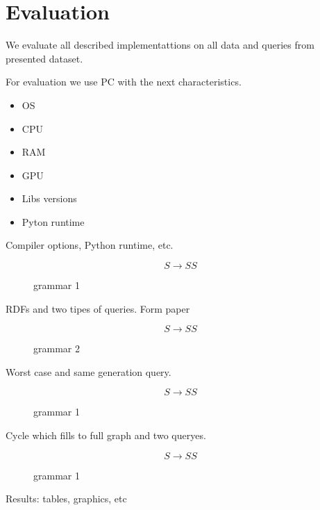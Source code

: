 \section{Evaluation}

We evaluate all described implementattions on all data and queries from presented dataset.

For evaluation we use PC with the next characteristics.
\begin{itemize}
  \item OS
  \item CPU
  \item RAM
  \item GPU
  \item Libs versions
  \item Pyton runtime
\end{itemize}

Compiler options, Python runtime, etc.

\begin{figure}
  $$
  S \rightarrow S S
  $$
  \caption{grammar 1}
\end{figure}

RDFs and two tipes of queries. Form paper~\cite{}

\begin{figure}
  $$
  S \rightarrow S S
  $$
  \caption{grammar 2}
\end{figure}


Worst case and same generation query.

\begin{figure}
  $$
  S \rightarrow S S
  $$
  \caption{grammar 1}
\end{figure}


Cycle which fills to full graph and two queryes.

\begin{figure}
  $$
  S \rightarrow S S
  $$
  \caption{grammar 1}
\end{figure}


Results: tables, graphics, etc
